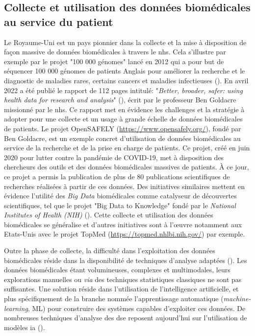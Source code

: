 \subsection{Collecte et utilisation des données biomédicales au service du patient}
Le Royaume-Uni est un pays pionnier dans la collecte et la mise à disposition de façon massive de données biomédicales à travers le \gls{nhs}. Cela s'illustre par exemple par le projet "100 000 génomes" lancé en 2012 qui a pour but de séquencer 100 000 génomes de patients Anglais pour améliorer la recherche et le diagnostic de maladies rares, certains cancers et maladies infectieuses (\cite{nunn_public_2019}). En avril 2022 a été publié le rapport de 112 pages intitulé: "\textit{Better, broader, safer: using health data for research and analysis}" (\cite{ben_goldacre_better_2022}), écrit par le professeur Ben Goldacre missionné par le \gls{nhs}. Ce rapport met en évidence les challenges et la stratégie à adopter pour une collecte et un usage à grande échelle de données biomédicales de patients. Le projet OpenSAFELY (\href{https://www.opensafely.org/}{https://www.opensafely.org/}), fondé par Ben Goldacre, est un exemple concret d'utilisation de données biomédicales au service de la recherche et de la prise en charge de patients. Ce projet, créé en juin 2020 pour lutter contre la pandémie de COVID-19, met à disposition des chercheurs des outils et des données biomédicales massives de patients. À ce jour, ce projet a permis la publication de plus de 80 publications scientifiques de recherches réalisées à partir de ces données. Des initiatives similaires mettent en évidence l'utilité des \textit{Big Data} biomédicales comme catalyseur de découvertes scientifiques, tel que le projet "Big Data to Knowledge" fondé par le \textit{National Institutes of Health (NIH)} (\cite{toga_big_2015}). Cette collecte et utilisation des données biomédicales se généralise et d'autres initiatives sont à l'œuvre notamment aux Etats-Unis avec le projet TopMed (\url{https://topmed.nhlbi.nih.gov/}) par exemple.

Outre la phase de collecte, la difficulté dans l'exploitation des données biomédicales réside dans la disponibilité de techniques d'analyse adaptées (\cite{wang_big_2019, ismail_requirements_2020}). Les données biomédicales étant volumineuses, complexes et multimodales, leurs explorations manuelles ou \textit{via} des techniques statistiques classiques ne sont pas suffisantes. Une solution réside dans l'utilisation de l'intelligence artificielle, et plus spécifiquement de la branche nommée l'apprentissage automatique (\textit{machine-learning}, ML) pour construire des systèmes capables d'exploiter ces données. De nombreuses techniques d'analyse des \gls{dse} reposent aujourd'hui sur l'utilisation de modèles \gls{ia} (\cite{yang_large_2022, de_mello_semantic_2022, li_electronic_2022}).

